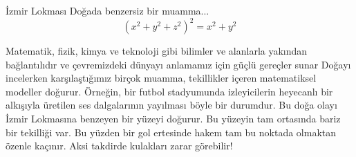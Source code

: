 \begin{surferPage}{İzmir Lokması}
Doğada benzersiz bir muamma...\\
\smallskip
\[(x^2+ y^2+ z^2)^2	= x^2+ y^2\]

\singlespacing
Matematik, fizik, kimya ve teknoloji gibi bilimler ve alanlarla yakından bağlantılıdır ve çevremizdeki dünyayı anlamamız için güçlü gereçler sunar
\singlespacing
Doğayı incelerken karşılaştığımız birçok muamma, tekillikler içeren matematiksel modeller doğurur.
\singlespacing
Örneğin, bir futbol stadyumunda  izleyicilerin heyecanlı bir alkışıyla üretilen ses dalgalarının yayılması böyle bir durumdur. Bu doğa olayı İzmir Lokmasına benzeyen bir  yüzeyi doğurur. Bu yüzeyin tam ortasında bariz bir tekilliği var. Bu yüzden bir gol ertesinde hakem tam bu noktada olmaktan özenle kaçınır. Aksi takdirde kulakları zarar görebilir!
\end{surferPage}
